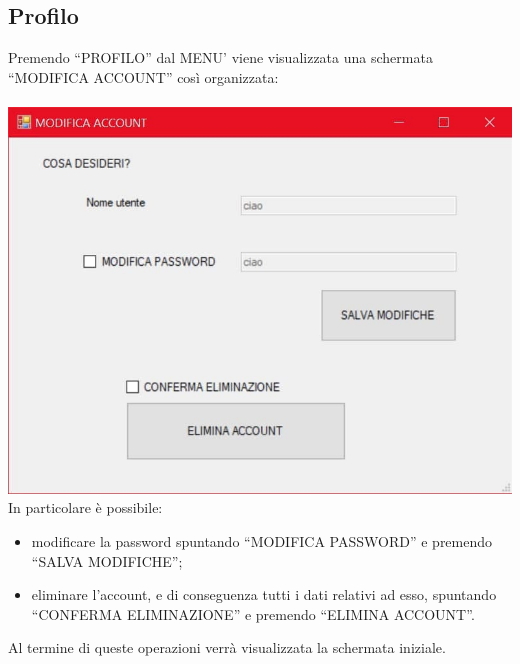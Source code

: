 \documentclass[a4paper, titlepage]{article}
\begin{document}
\subsection{Profilo}
Premendo “PROFILO” dal MENU’ viene visualizzata una schermata “MODIFICA ACCOUNT” così organizzata:\\\\
\includegraphics[scale=0.30]{Immagini/form/Form GestioneUtente.jpg}
\\In particolare è possibile:
\begin{itemize}
    \item modificare la password spuntando “MODIFICA PASSWORD” e premendo “SALVA MODIFICHE”;
    \item eliminare l’account, e di conseguenza tutti i dati relativi ad esso, spuntando “CONFERMA ELIMINAZIONE” e premendo “ELIMINA ACCOUNT”.
\end{itemize} 
Al termine di queste operazioni verrà visualizzata la schermata iniziale.
\newpage
\end{document}
